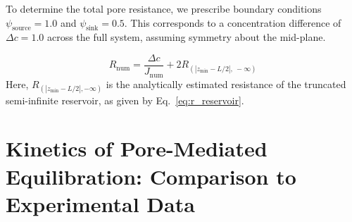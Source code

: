 \documentclass[10pt, a4paper]{article}
\begin{document}
\begin{multicols}{2}
To determine the total pore resistance, we prescribe boundary conditions $\psi_{\text{source}} = 1.0$ and $\psi_{\text{sink}} = 0.5$.
This corresponds to a concentration difference of $\Delta c = 1.0$ across the full system, assuming symmetry about the mid-plane.

\begin{equation}
    R_{\text{num}} = \frac{\Delta c}{J_{\text{num}}} + 2 R_{\left(\left|z_{\text{min}} - L/2\right|,\ -\infty\right)}
\end{equation}
Here, $R_{(|z_{\text{min}} - L/2|, -\infty)}$ is the analytically estimated resistance of the truncated semi-infinite reservoir, as given by Eq.~\ref{eq:r_reservoir}.

\end{multicols}

\section{Kinetics of Pore-Mediated Equilibration: Comparison to Experimental Data}
\end{document}
